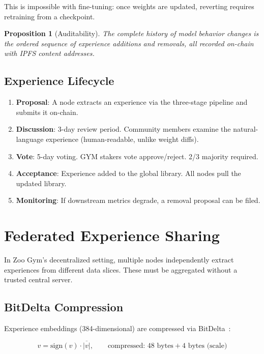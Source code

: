 \documentclass[11pt,letterpaper]{article}
\newtheorem{proposition}[theorem]{Proposition}
\begin{document}
This is impossible with fine-tuning: once weights are updated, reverting requires retraining from a checkpoint.

\begin{proposition}[Auditability]
The complete history of model behavior changes is the ordered sequence of experience additions and removals, all recorded on-chain with IPFS content addresses.
\end{proposition}

\subsection{Experience Lifecycle}

\begin{enumerate}
    \item \textbf{Proposal}: A node extracts an experience via the three-stage pipeline and submits it on-chain.
    \item \textbf{Discussion}: 3-day review period.  Community members examine the natural-language experience (human-readable, unlike weight diffs).
    \item \textbf{Vote}: 5-day voting.  GYM stakers vote approve/reject.  2/3 majority required.
    \item \textbf{Acceptance}: Experience added to the global library.  All nodes pull the updated library.
    \item \textbf{Monitoring}: If downstream metrics degrade, a removal proposal can be filed.
\end{enumerate}

\section{Federated Experience Sharing}
\label{sec:federated}

In Zoo Gym's decentralized setting, multiple nodes independently extract experiences from different data slices.  These must be aggregated without a trusted central server.

\subsection{BitDelta Compression}

Experience embeddings (384-dimensional) are compressed via BitDelta~\cite{liu2024bitdelta}:

\begin{equation}
    \hat{v} = \text{sign}(v) \cdot \overline{|v|}, \qquad \text{compressed: } 48 \text{ bytes} + 4 \text{ bytes (scale)}
\end{equation}
\end{document}
